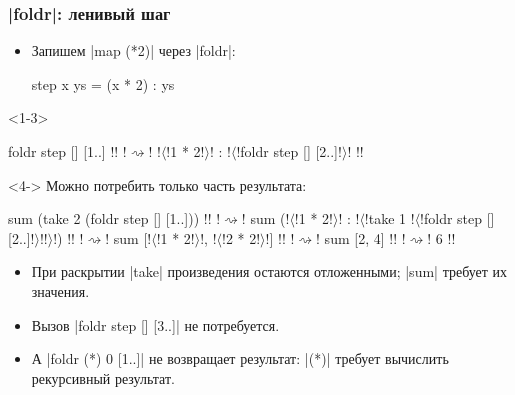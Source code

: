 \documentclass[11pt]{beamer}
\begin{document}
\begin{frame}[fragile,t]
  \frametitle{\haskinline|foldr|: ленивый шаг}
  \begin{itemize}
    \item Запишем \haskinline|map (*2)| через \haskinline|foldr|:
          \begin{haskellsmall}
            step x ys = (x * 2) : ys
          \end{haskellsmall}
  \end{itemize}
    \begin{onlyenv}<1-3>
      \begin{haskellsmall}
        foldr step [] [1..] !! !$\rightsquigarrow$!
        !$\langle$!1 * 2!$\rangle$! : !$\langle$!foldr step [] [2..]!$\rangle$! !!
      \end{haskellsmall}
    \end{onlyenv}
    \begin{onlyenv}<4->
      Можно потребить только часть результата:
      \begin{haskellsmall}
        sum (take 2 (foldr step [] [1..])) !! !$\rightsquigarrow$!
        sum (!$\langle$!1 * 2!$\rangle$! : !$\langle$!take 1 !$\langle$!foldr step [] [2..]!$\rangle$!!$\rangle$!) !! !$\rightsquigarrow$!
        sum [!$\langle$!1 * 2!$\rangle$!, !$\langle$!2 * 2!$\rangle$!] !! !$\rightsquigarrow$!
        sum [2, 4] !! !$\rightsquigarrow$! 6 !!
      \end{haskellsmall}
      \begin{itemize}
        \item<6-> При раскрытии \haskinline|take| произведения остаются отложенными; \haskinline|sum| требует их значения.
        \item<8-> Вызов \haskinline|foldr step [] [3..]| не потребуется.
        \item<9-> А \haskinline|foldr (*) 0 [1..]| не возвращает результат: \haskinline|(*)| требует вычислить рекурсивный результат.
      \end{itemize}
    \end{onlyenv}
\end{frame}
\end{document}

